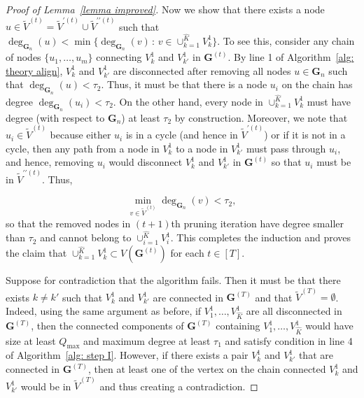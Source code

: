 \documentclass[twoside,11pt]{article}
\theoremstyle{remark}
\begin{document}
\begin{proof}[Proof of Lemma~\ref{lemma improved}]

Now we show that there exists a node $u \in \tilde{V}^{(t)} = \tilde{V}^{
\prime(t)} \cup \tilde{V}^{\prime \prime(t)}$ such that $\operatorname{deg}_{\bm{G}_n}(u) < \min\{ \operatorname{deg}_{\bm{G}_n}(v) \,:\, v \in \cup_{k=1}^{\hat K} V^1_k \}$. To see this, consider any chain of nodes $\{u_1, \ldots, u_m\}$ connecting $V^1_k$ and $V^1_{k'}$ in $\bm{G}^{(t)}$. By line 1 of Algorithm~\ref{alg: theory align}, $V^1_k$ and $V^1_{k'}$ are disconnected after removing all nodes $u \in \bm{G}_n$ such that $\operatorname{deg}_{\bm{G}_n}(u) < \tau_2$.
Thus, it must be that there is a node $u_i$ on the chain has degree $\operatorname{deg}_{\bm{G}_n}(u_i) < \tau_2$. On the other hand, every node in $\cup_{k=1}^{{\hat K}} V^1_k$ must have degree (with respect to $\bm{G}_n$) at least $\tau_2$ by construction. Moreover, we note that $u_i \in \tilde{V}^{(t)}$ because either $u_i$ is in a cycle (and hence in $\tilde{V}^{\prime (t)}$) or if it is not in a cycle, then any path from a node in $V^1_k$ to a node in $V^1_{k'}$ must pass through $u_i$, and hence, removing $u_i$ would disconnect $V^1_k$ and $V^1_{k'}$ in $\bm{G}^{(t)}$ so that $u_i$ must be in $\tilde{V}^{\prime \prime(t)}$. Thus,

\begin{equation}
\label{lemma improved eqn 1}
    \min_{v \in \tilde{V}^{(t)}} \operatorname{deg}_{\bm{G}_n}\left(v\right) <\tau_2, 
\end{equation}
so that the removed nodes in $(t+1)$th pruning iteration have degree smaller than $\tau_2$ and cannot belong to $\cup_{i=1}^{\hat{K}} V^1_i$. This completes the induction and proves the claim that $\cup_{k=1}^{\hat{K}} V^1_k \subset V(\bm{G}^{(t)})$ for each $t \in [T]$.


Suppose for contradiction that the algorithm fails. Then it must be that there exists $k \neq k'$ such that $V^1_k$ and $V^1_{k'}$ are connected in $\bm{G}^{(T)}$ and that $\tilde{V}^{(T)} = \emptyset$. Indeed, using the same argument as before, if $V^1_1, \ldots, V^1_{\hat{K}}$ are all disconnected in $\bm{G}^{(T)}$, then the connected components of $\bm{G}^{(T)}$ containing $V_1^1, \ldots, V^1_{\hat{K}}$ would have size at least $Q_{\max}$ and maximum degree at least $\tau_1$ and satisfy condition in line 4 of Algorithm~\ref{alg: step I}. However, if there exists a pair $V^1_k$ and $V^1_{k'}$ that are connected in $\bm{G}^{(T)}$, then at least one of the vertex on the chain connected $V^1_k$ and $V^1_{k'}$ would be in $\tilde{V}^{(T)}$ and thus creating a contradiction. 


\end{proof}
\end{document}
